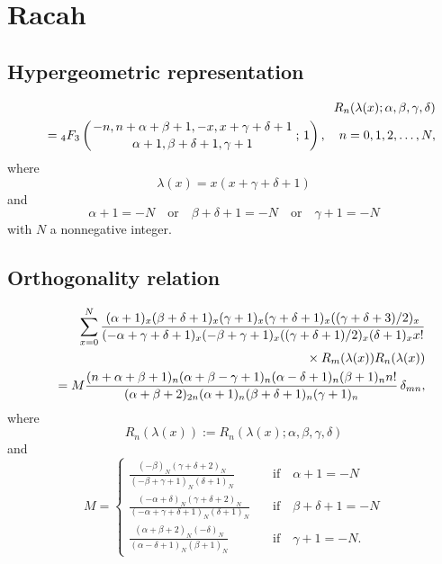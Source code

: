 \documentclass[envcountchap,graybox]{svmono}
\newcommand{\hyp}[5]{\mbox{}_{#1}{F}_{#2}
\left(\genfrac{}{}{0pt}{}{#3}{#4}\,;\,#5\right)}
\newcommand{\mathindent}{\hspace{7.5mm}}
\newcommand{\hyp}[5]{\,\mbox{}_{#1}F_{#2}\!\left(
  \genfrac{}{}{0pt}{}{#3}{#4};#5\right)}
\begin{document}
\section{Racah}

\par\setcounter{equation}{0}

\subsection*{Hypergeometric representation}
\begin{eqnarray}
\label{DefRacah}
& &R_n(\lambda(x);\alpha,\beta,\gamma,\delta)\nonumber\\
& &{}=\hyp{4}{3}{-n,n+\alpha+\beta+1,-x,x+\gamma+\delta+1}{\alpha+1,\beta+\delta+1,\gamma+1}{1},
\quad n=0,1,2,\ldots,N,
\end{eqnarray}
where
$$\lambda(x)=x(x+\gamma+\delta+1)$$
and
$$\alpha+1=-N\quad\textrm{or}\quad\beta+\delta+1=-N\quad\textrm{or}\quad\gamma+1=-N$$
with $N$ a nonnegative integer.

\subsection*{Orthogonality relation}
\begin{eqnarray}
\label{OrtRacah}
& &\sum_{x=0}^N\frac{(\alpha+1)_x(\beta+\delta+1)_x(\gamma+1)_x(\gamma+\delta+1)_x((\gamma+\delta+3)/2)_x}
{(-\alpha+\gamma+\delta+1)_x(-\beta+\gamma+1)_x((\gamma+\delta+1)/2)_x(\delta+1)_xx!}\nonumber\\
& &{}\mathindent\times R_m(\lambda(x))R_n(\lambda(x))\nonumber\\
& &{}=M\frac{(n+\alpha+\beta+1)_n(\alpha+\beta-\gamma+1)_n(\alpha-\delta+1)_n(\beta+1)_nn!}
{(\alpha+\beta+2)_{2n}(\alpha+1)_n(\beta+\delta+1)_n(\gamma+1)_n}\,\delta_{mn},
\end{eqnarray}
where
$$R_n(\lambda(x)):=R_n(\lambda(x);\alpha,\beta,\gamma,\delta)$$
and
$$M=\left\{\begin{array}{ll}
\displaystyle\frac{(-\beta)_N(\gamma+\delta+2)_N}{(-\beta+\gamma+1)_N(\delta+1)_N}&\quad\textrm{if}\quad\alpha+1=-N\\[5mm]
\displaystyle\frac{(-\alpha+\delta)_N(\gamma+\delta+2)_N}{(-\alpha+\gamma+\delta+1)_N(\delta+1)_N}&\quad\textrm{if}\quad\beta+\delta+1=-N\\[5mm]
\displaystyle\frac{(\alpha+\beta+2)_N(-\delta)_N}{(\alpha-\delta+1)_N(\beta+1)_N}&\quad\textrm{if}\quad\gamma+1=-N.
\end{array}\right.$$
\end{document}
